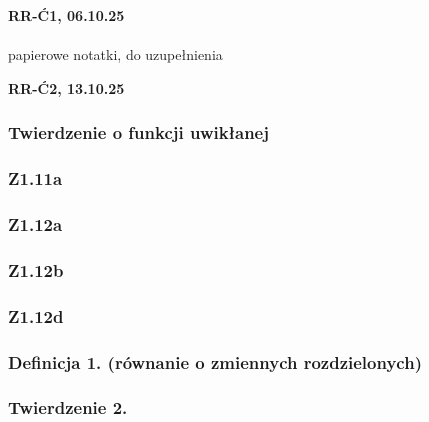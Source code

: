 \documentclass[10pt,a4paper]{article}
\newcommand{\zagadnienie}[3]{%
    \clearpage %
    \noindent\textbf{#1} #2\\
    #3
}
\begin{document}
\zagadnienie{RR-Ć1, 06.10.25}{}
{
    \\papierowe notatki, do uzupełnienia
}
\zagadnienie{RR-Ć2, 13.10.25}{}
{
    \begin{tcolorbox}[mybox]
    \subsubsection*{Twierdzenie o funkcji uwikłanej}
    \begin{quote}
    \end{quote}
    \end{tcolorbox}

    \subsubsection*{Z1.11a}
    \begin{quote}
    \end{quote}

    \subsubsection*{Z1.12a}
    \begin{quote}
    \end{quote}
        
    \subsubsection*{Z1.12b}
    \begin{quote}
    \end{quote}

    \subsubsection*{Z1.12d}
    \begin{quote}
    \end{quote}

    \begin{tcolorbox}[mybox]
    \subsubsection*{Definicja 1. (równanie o zmiennych rozdzielonych)}
    \begin{quote}
    \end{quote}

    \subsubsection*{Twierdzenie 2.}
    \begin{quote}
    \end{quote}
    \end{tcolorbox}

}
\end{document}
